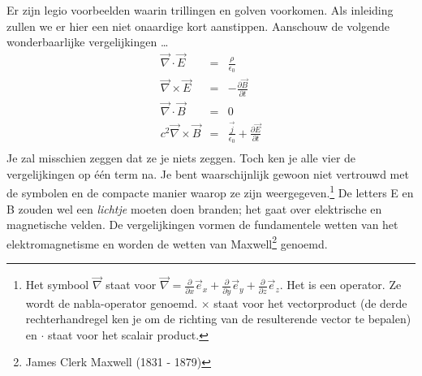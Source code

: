 \documentclass{ximera}
\begin{document}
	\author{Bart Lambregs}
    \xmsource



	Er zijn legio voorbeelden waarin trillingen en golven voorkomen. Als inleiding zullen we er hier een niet onaardige kort aanstippen. Aanschouw de volgende wonderbaarlijke vergelijkingen \ldots
	\begin{eqnarray*}
	\vec{\nabla}\cdot\vec{E}&=&\frac{\rho}{\epsilon_0}\\[3mm]
	\vec{\nabla}\times\vec{E}&=&-\frac{\partial\vec{B}}{\partial t}\\[3mm]
	\vec{\nabla}\cdot\vec{B}&=&0\\[3mm]
	c^2\vec{\nabla}\times\vec{B}&=&\frac{\vec{j}}{\epsilon_0}+\frac{\partial\vec{E}}{\partial t}\\
	\end{eqnarray*}
	Je zal misschien zeggen dat ze je niets zeggen. Toch ken je alle vier de vergelijkingen op \'e\'en term na. Je bent waarschijnlijk gewoon niet vertrouwd met de symbolen en de compacte manier waarop ze zijn weergegeven.\footnote{Het symbool $\vec{\nabla}$ staat voor $\vec{\nabla}=\frac{\partial}{\partial x}\vec{e}_x+\frac{\partial}{\partial y}\vec{e}_y+\frac{\partial}{\partial z}\vec{e}_z$. Het is een operator. Ze wordt de nabla-operator genoemd. $\times$ staat voor het vectorproduct (de derde rechterhandregel ken je om de richting van de resulterende vector te bepalen) en $\cdot$ staat voor het scalair product.} De letters E en B zouden wel een \emph{lichtje} moeten doen branden; het gaat over elektrische en magnetische velden. De vergelijkingen vormen de fundamentele wetten van het elektromagnetisme en worden de wetten van Maxwell\footnote{James Clerk Maxwell (1831 - 1879)} genoemd.
	
	
\end{document}
